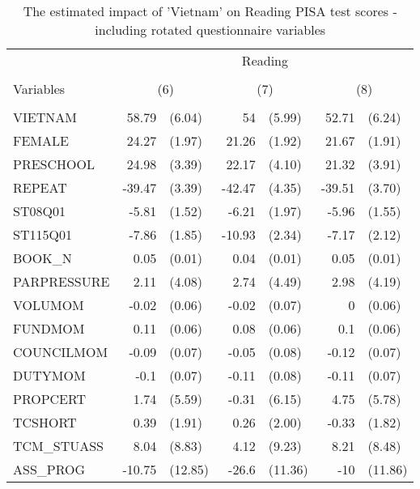 \documentclass[10pt]{article}
\begin{document}
	\begin{table}[H]
		\small
		\def\arraystretch{0.7}
		\def\tabcolsep{14}
		\centering
		\captionsetup{justification=centering}
		\caption{The estimated impact of 'Vietnam' on Reading PISA test scores - including rotated questionnaire variables}
		\begin{threeparttable}
			\begin{tabular}{lrlrlrl}
				\toprule
				\midrule
				& \multicolumn{6}{c}{Reading} \\
				\cline{2-7} \\
				Variables & \multicolumn{2}{c}{(6)} & \multicolumn{2}{c}{(7)} & \multicolumn{2}{c}{(8)} \\
				\hline\\				
				VIETNAM & 58.79 & (6.04) & 54    & (5.99) & 52.71 & (6.24) \\[0.2em]
				FEMALE & 24.27 & (1.97) & 21.26 & (1.92) & 21.67 & (1.91) \\[0.2em]
				PRESCHOOL & 24.98 & (3.39) & 22.17 & (4.10) & 21.32 & (3.91) \\[0.2em]
				REPEAT & -39.47 & (3.39) & -42.47 & (4.35) & -39.51 & (3.70) \\[0.2em]
				ST08Q01 & -5.81 & (1.52) & -6.21 & (1.97) & -5.96 & (1.55) \\[0.2em]
				ST115Q01 & -7.86 & (1.85) & -10.93 & (2.34) & -7.17 & (2.12) \\[0.2em]
				BOOK\_N & 0.05  & (0.01) & 0.04  & (0.01) & 0.05  & (0.01) \\[0.2em]
				PARPRESSURE & 2.11  & (4.08) & 2.74  & (4.49) & 2.98  & (4.19) \\[0.2em]
				VOLUMOM & -0.02 & (0.06) & -0.02 & (0.07) & 0     & (0.06) \\[0.2em]
				FUNDMOM & 0.11  & (0.06) & 0.08  & (0.06) & 0.1   & (0.06) \\[0.2em]
				COUNCILMOM & -0.09 & (0.07) & -0.05 & (0.08) & -0.12 & (0.07) \\[0.2em]
				DUTYMOM & -0.1  & (0.07) & -0.11 & (0.08) & -0.11 & (0.07) \\[0.2em]
				PROPCERT & 1.74  & (5.59) & -0.31 & (6.15) & 4.75  & (5.78) \\[0.2em]
				TCSHORT & 0.39  & (1.91) & 0.26  & (2.00) & -0.33 & (1.82) \\[0.2em]
				TCM\_STUASS & 8.04  & (8.83) & 4.12  & (9.23) & 8.21  & (8.48) \\[0.2em]
				ASS\_PROG & -10.75 & (12.85) & -26.6 & (11.36) & -10   & (11.86) \\[0.2em]

\end{tabular}
\end{threeparttable}
\end{table}
\end{document}
